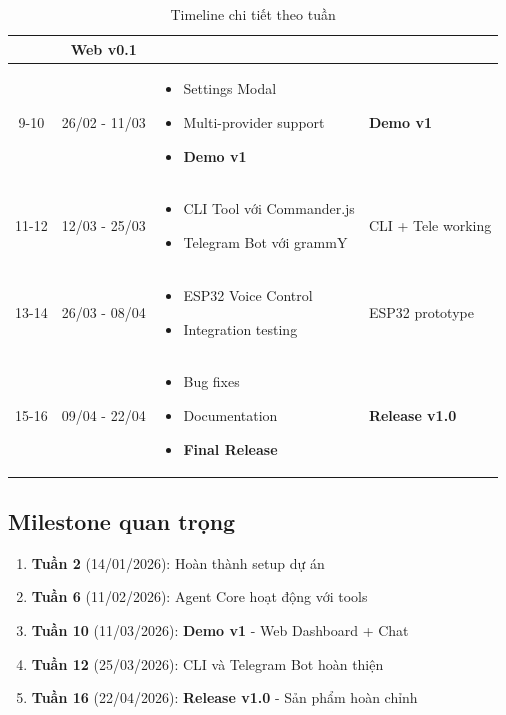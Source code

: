 \documentclass[12pt,a4paper]{article}
\begin{document}
\begin{table}[H]
\begin{tabular}{|c|c|p{7cm}|p{3cm}|}
\begin{itemize}[leftmargin=*, nosep]
        \end{itemize} & Web v0.1 \\
        \hline
        9-10 & 26/02 - 11/03 & 
        \begin{itemize}[leftmargin=*, nosep]
            \item Settings Modal
            \item Multi-provider support
            \item \textbf{Demo v1}
        \end{itemize} & \textbf{Demo v1} \\
        \hline
        11-12 & 12/03 - 25/03 & 
        \begin{itemize}[leftmargin=*, nosep]
            \item CLI Tool với Commander.js
            \item Telegram Bot với grammY
        \end{itemize} & CLI + Tele working \\
        \hline
        13-14 & 26/03 - 08/04 & 
        \begin{itemize}[leftmargin=*, nosep]
            \item ESP32 Voice Control
            \item Integration testing
        \end{itemize} & ESP32 prototype \\
        \hline
        15-16 & 09/04 - 22/04 & 
        \begin{itemize}[leftmargin=*, nosep]
            \item Bug fixes
            \item Documentation
            \item \textbf{Final Release}
        \end{itemize} & \textbf{Release v1.0} \\
        \hline
    \end{tabular}
    \caption{Timeline chi tiết theo tuần}
\end{table}

\subsection{Milestone quan trọng}

\begin{enumerate}
    \item \textbf{Tuần 2} (14/01/2026): Hoàn thành setup dự án
    \item \textbf{Tuần 6} (11/02/2026): Agent Core hoạt động với tools
    \item \textbf{Tuần 10} (11/03/2026): \colorbox{yellow!30}{\textbf{Demo v1}} - Web Dashboard + Chat
    \item \textbf{Tuần 12} (25/03/2026): CLI và Telegram Bot hoàn thiện
    \item \textbf{Tuần 16} (22/04/2026): \colorbox{green!30}{\textbf{Release v1.0}} - Sản phẩm hoàn chỉnh
\end{enumerate}
\end{document}
